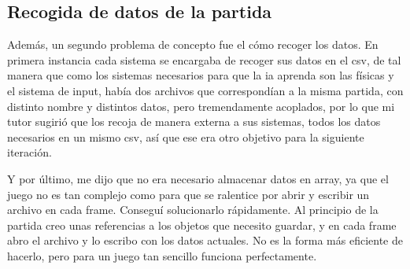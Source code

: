 \subsection{Recogida de datos de la partida}
Además, un segundo problema de concepto fue el cómo recoger los datos. En primera instancia cada sistema se encargaba de recoger sus datos en el \gls{csv}, de tal manera que como los sistemas necesarios para que la \gls{ia} aprenda son las físicas y el sistema de input, había dos archivos que correspondían a la misma partida, con distinto nombre y distintos datos, pero tremendamente acoplados, por lo que mi tutor sugirió que los recoja de manera externa a sus sistemas, todos los datos necesarios en un mismo \gls{csv}, así que ese era otro objetivo para la siguiente iteración. 

Y por último, me dijo que no era necesario almacenar datos en array, ya que el juego no es tan complejo como para que se ralentice por abrir y escribir un archivo en cada frame. Conseguí solucionarlo rápidamente. Al principio de la partida creo unas referencias a los objetos que necesito guardar, y en cada frame abro el archivo y lo escribo con los datos actuales. No es la forma más eficiente de hacerlo, pero para un juego tan sencillo funciona perfectamente.

